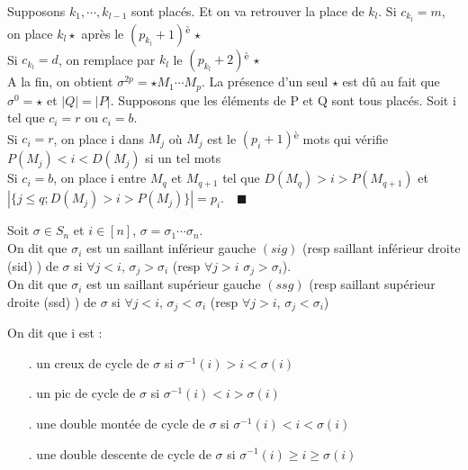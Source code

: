 			Supposons $k_{1},\cdots, k_{l-1} $ sont placés. Et on va retrouver la place de $k_{l}$.
			Si $c_{k_{l}} = m$, on place $k_{l}\star$ après le $(p_{k_{l}}+1)$\textsuperscript{è} $\star$\\
			Si $c_{k_{l}}=d$, on remplace par $k_{l}$ le $(p_{k_{l}}+2)$\textsuperscript{è} $\star$\\
			A la fin, on obtient $\sigma^{2p} = \star M_{1}\cdots M_{p} $. La présence d'un seul $\star$ est dû au fait que $\sigma^0 = \star$ et $|Q| = |P|$. Supposons que les éléments de P et Q sont tous placés. Soit i tel que $c_{i}=r \text{ ou } c_{i}=b$.\\
			Si $c_{i}=r$, on place i dans $M_{j}$ où $M_{j}$ est le $(p_{i}+1)$\textsuperscript{è} mots qui vérifie $P(M_{j}) < i < D(M_{j})$ si un tel mots\\
			Si $c_{i}=b$, on place i entre $M_{q}$ et $M_{q+1}$ tel que $D(M_{q})>i>P(M_{q+1}) $ et\\ $|\{j\leq q; D(M_{j})>i>P(M_{j})\}| = p_{i} $. $\text{ } \blacksquare$\\
			\begin{definition}
				\begin{rm}
						Soit $\sigma\in S_{n}$ et  $i\in [n]$, $\sigma=\sigma_{1}\cdots \sigma_{n}$.\\On dit que $\sigma_{i}$ est un saillant inférieur gauche $(sig)$ (resp saillant inférieur droite (sid) )  de $\sigma$ si $\forall j<i\text{, }\sigma_{j}>\sigma_{i}$ (resp $\forall j>i$ $\sigma_{j}>\sigma_{i}$).\\
						On dit que $\sigma_{i}$ est un saillant supérieur gauche $(ssg)$ (resp saillant supérieur droite (ssd) )  de $\sigma$ si $\forall j<i\text{, }\sigma_{j}<\sigma_{i}$ (resp $\forall j>i$, $\sigma_{j}<\sigma_{i}$)
				\end{rm}
			\end{definition}

			\begin{definition}
				\begin{rm}
					On dit que i est :
						\begin{itemize}
							\item[.] un creux de cycle de $\sigma$ si $\sigma^{-1}(i)>i<\sigma(i)$
							\item[.] un pic de cycle de $\sigma$ si $\sigma^{-1}(i)<i>\sigma(i)$
							\item[.] une double montée de cycle de $\sigma$ si  $\sigma^{-1}(i)<i<\sigma(i)$
							\item[.] une double descente de cycle de $\sigma$ si $\sigma^{-1}(i)\geq i \geq \sigma(i)$
						\end{itemize}
				\end{rm}
			\end{definition}

